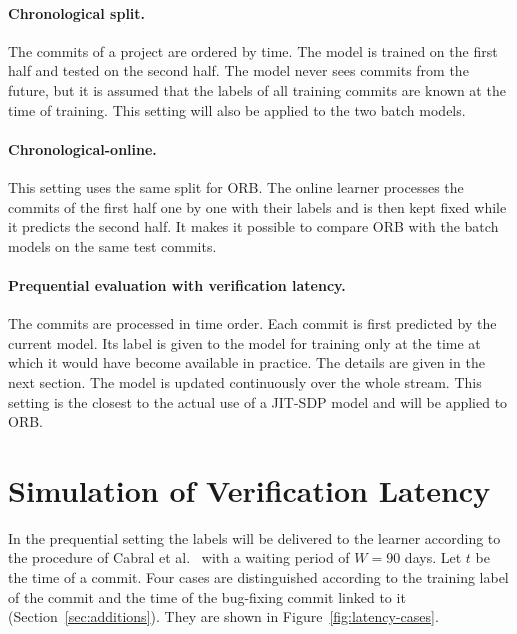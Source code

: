 \documentclass[12pt,a4paper,oneside]{report}
\begin{document}
\paragraph{Chronological split.} The commits of a project are ordered by
time. The model is trained on the first half and tested on the second half.
The model never sees commits from the future, but it is assumed that the
labels of all training commits are known at the time of training. This
setting will also be applied to the two batch models.

\paragraph{Chronological-online.} This setting uses the same split for ORB.
The online learner processes the commits of the first half one by one with
their labels and is then kept fixed while it predicts the second half. It
makes it possible to compare ORB with the batch models on the same test
commits.

\paragraph{Prequential evaluation with verification latency.} The commits are
processed in time order. Each commit is first predicted by the current model.
Its label is given to the model for training only at the time at which it
would have become available in practice. The details are given in the next
section. The model is updated continuously over the whole stream. This
setting is the closest to the actual use of a JIT-SDP model and will be
applied to ORB.

\section{Simulation of Verification Latency}\label{sec:latency-method}

In the prequential setting the labels will be delivered to the learner
according to the procedure of Cabral et al.~\cite{cabral2019orb} with a
waiting period of $W = 90$ days. Let $t$ be the time of a commit. Four cases
are distinguished according to the training label of the commit and the time
of the bug-fixing commit linked to it (Section~\ref{sec:additions}). They are
shown in Figure~\ref{fig:latency-cases}.
\end{document}
